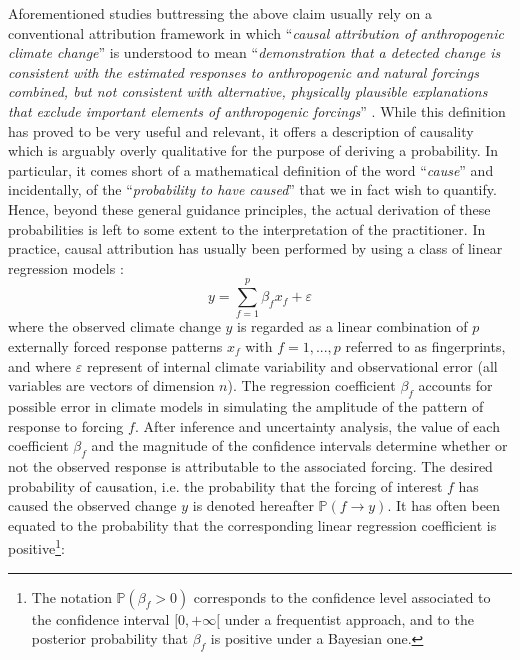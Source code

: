 \documentclass[12pt]{article}
\newcommand{\Proba}{\mathbb P}
\begin{document}
Aforementioned studies buttressing the above claim usually rely on a conventional attribution framework in which ``\textit{causal attribution of anthropogenic climate change}'' is understood to mean ``\textit{demonstration that a detected change is consistent with the estimated responses to anthropogenic and natural forcings combined, but not consistent with alternative, physically plausible explanations that exclude important elements of anthropogenic forcings}'' \citep{Guidance}. While this definition has proved to be very useful and relevant, it offers a description of causality which is arguably overly qualitative for the purpose of deriving a probability. In particular, it comes short of a mathematical definition of the word ``\textit{cause}'' and incidentally, of the ``\textit{probability to have caused}'' that we in fact wish to quantify. Hence, beyond these general guidance principles, the actual derivation of these probabilities is left to some extent to the interpretation of the practitioner. In practice, causal attribution has usually been performed by using a class of linear regression models \citep{HZ11}: 
\begin{equation}\label{regress}
y=\sum_{f=1}^p \beta_f x_f+\varepsilon
\end{equation}
where the observed climate change $y$ is regarded as a linear combination of $p$ externally forced response patterns $x_f$ with $f=1,..., p$ referred to as fingerprints, and where $\varepsilon$ represent of internal climate variability and observational error (all variables are vectors of dimension $n$). The regression coefficient $\beta_f$ accounts for possible error in climate models in simulating the amplitude of the pattern of response to forcing $f$. After inference and uncertainty analysis, the value of each coefficient $\beta_f$ and the magnitude of the confidence intervals determine whether or not the observed response is attributable to the associated forcing. The desired probability of causation, i.e. the probability that the forcing of interest $f$ has caused the observed change $y$ is denoted hereafter $\Proba(f\rightarrow y)$. It has often been equated to the probability that the corresponding linear regression coefficient is positive\footnote{The notation $\Proba(\beta_f>0)$ corresponds to the confidence level associated to the confidence interval $[0,+\infty[$ under a frequentist approach, and to the posterior probability that $\beta_f$ is positive under a Bayesian one. %
}:
\end{document}
